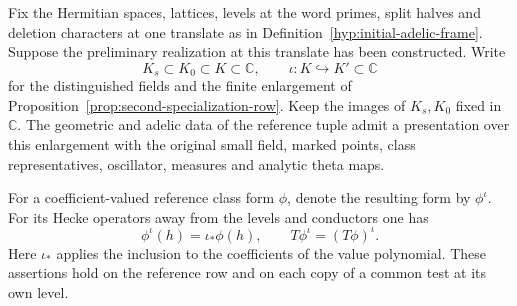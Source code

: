 \begin{auxlemma}
\label{lem:second-core-reference}
Fix the Hermitian spaces, lattices, levels at the word primes, split
halves and deletion characters at one translate as in
Definition~\ref{hyp:initial-adelic-frame}. Suppose the preliminary
realization at this translate has been constructed. Write
\[
 K_s\subset K_0\subset K\subset\mathbb C,\qquad
 \iota:K\hookrightarrow K'\subset\mathbb C
\]
for the distinguished fields and the finite enlargement of
Proposition~\ref{prop:second-specialization-row}. Keep the images
of \(K_s,K_0\) fixed in \(\mathbb C\). The geometric and adelic
data of the reference tuple admit a presentation over this
enlargement with the original small field, marked points, class
representatives, oscillator, measures and analytic theta maps.

For a coefficient-valued reference class form \(\phi\), denote the
resulting form by \(\phi^\iota\). For its Hecke operators away
from the levels and conductors one has
\[
 \phi^\iota(h)=\iota_*\phi(h),\qquad
 T\phi^\iota=(T\phi)^\iota .
\]
Here \(\iota_*\) applies the inclusion to the coefficients of the
value polynomial. These assertions hold on the reference row and
on each copy of a common test at its own level.
\end{auxlemma}
